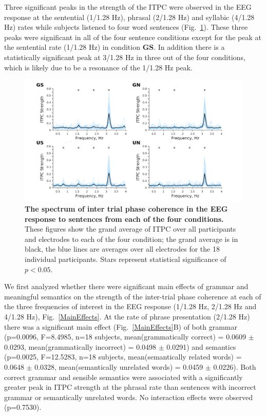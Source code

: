 \documentclass[a4paper,10pt,twoside]{article}
\begin{document}
Three significant peaks in the strength of the ITPC were observed in the EEG response at the sentential (1/1.28 Hz), phrasal (2/1.28 Hz) and syllabic (4/1.28 Hz) rates while subjects listened to four word sentences (Fig.~\ref{Fig1}). These three peaks were significant in all of the four sentence conditions except for the peak at the sentential rate (1/1.28 Hz) in condition \textbf{GS}. In addition there is a statistically significant peak at 3/1.28 Hz in three out of the four conditions, which is likely due to be a resonance of the 1/1.28 Hz peak.

\begin{figure}[tbp]
\includegraphics[width=\linewidth]{ITPC_by_condition.png}
\caption{\textbf{The spectrum of inter trial phase coherence in the
    EEG response to sentences from each of the four conditions.} These
  figures show the grand average of ITPC over all participants and
  electrodes to each of the four condition; the grand average is in
  black, the blue lines are averages over all electrodes for the 18
  individual participants. Stars represent statistical significance of
  $p<0.05$.}
\label{Fig1}
\end{figure}

We first analyzed whether there were significant main effects of grammar and meaningful semantics on the strength of the inter-trial phase coherence at each of the three frequencies of interest in the EEG response (1/1.28 Hz, 2/1.28 Hz and 4/1.28 Hz), Fig.~\ref{MainEffects}. At the rate of phrase presentation (2/1.28 Hz) there was a significant main effect (Fig.~\ref{MainEffects}B) of both grammar (p=0.0096, F=8.4985, n=18 subjects, mean(grammatically correct) =  0.0609 $\pm$ 0.0293, mean(grammatically incorrect) = 0.0498 $\pm$ 0.0291) and semantics (p=0.0025, F=12.5283, n=18 subjects, mean(semantically related words) = 0.0648 $\pm$ 0.0328, mean(semantically unrelated words) = 0.0459 $\pm$ 0.0226). Both correct grammar and sensible semantics were associated with a significantly greater peak in ITPC strength at the phrasal rate than sentences with incorrect grammar or semantically unrelated words. No interaction effects were observed (p=0.7530).
\end{document}
